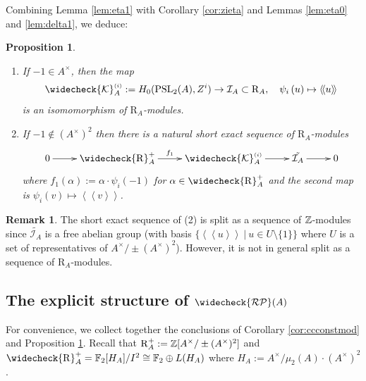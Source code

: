 \documentclass[12pt]{amsart}
\newtheorem{prop}[lem]{Proposition}
\theoremstyle{definition}
\newtheorem{rem}[lem]{Remark}
\newcommand{\F}[1]{\Bbb{F}_{#1}}
\newcommand{\Z}{\Bbb{Z}}
\newcommand{\K}{\mathcal{K}}
\newcommand{\pspl}[2]{\mathrm{PSL}_{#1}(#2)}
\newcommand{\crpb}[1]{\widecheck{\mathcal{RP}}(#1)}
\newcommand{\suss}[2]{\psi_{#1}\left( #2\right)}
\newcommand{\cks}[2]{\widecheck{{\K}}^{\mbox{\tiny $(#1)$}}_{#2}}
\newcommand{\ccconstmod}[1]{\widecheck{\mathcal{D}}_{#1}}
\newcommand{\<}{\langle}
\renewcommand{\>}{\rangle}
\newcommand{\sgr}[1]{\mathrm{R}_{#1}}%
\newcommand{\qsgr}[1]{\mathrm{R}^{+}_{#1}} %
\newcommand{\tsgr}[1]{\widecheck{\mathrm{R}}^{+}_{#1}} %
\newcommand{\pf}[1]{\left\langle\!\left\langle{#1}\right\rangle\!\right\rangle}
\newcommand{\aug}[1]{\mathcal{I}_{#1}}
\begin{document}
Combining Lemma \ref{lem:eta1} with  Corollary \ref{cor:zieta} and Lemmas \ref{lem:eta0} and \ref{lem:delta1}, we  deduce:
\begin{prop}\label{prop:cksia}
\begin{enumerate}
\item  If $-1\in A^\times$,  then the map
\[
\cks{i}{A}:=H_0(\pspl{2}{A},Z^i)\to \aug{A}\subset\sgr{A},\quad \suss{i}{u}\mapsto \pf{u}
\]
is an isomomorphism of $\sgr{A}$-modules.
\item If $-1\not\in (A^\times)^2$ then  there is a natural short exact sequence of $\sgr{A}$-modules 
\[
\xymatrix{
0\ar[r]& \tsgr{A}\ar^-{f_1}[r]&\cks{i}{A}\ar[r]&\tilde{\aug{A}}\ar[r]& 0\\
}
\]
where $f_1(\alpha):=\alpha\cdot\suss{i}{-1}$ for $\alpha\in \tsgr{A}$ and the second map is $\suss{i}{v}\mapsto \pf{v}$.
\end{enumerate}
\end{prop}



\begin{rem} The short exact sequence of (2) is split as a sequence of $\Z$-modules since $\tilde{\aug{A}}$ is a free abelian group (with basis $\{ \pf{u}\ |\ u\in U\setminus\{ 1\} \}$ where 
$U$ is a set of representatives of $A^\times/\pm(A^\times)^2$).  However, it is not in general split as a sequence of $\sgr{A}$-modules.
\end{rem}


\subsection{The explicit structure of $\crpb{A}$}



For convenience, we collect together the conclusions of Corollary \ref{cor:ccconstmod}  and Proposition \ref{prop:cksia}. Recall that $\qsgr{A}:=\Z[A^\times/\pm(A^\times)^2]$ and $\tsgr{A}=\F{2}[H_A]/I^2\cong \F{2}\oplus L(H_A)$ where $H_A:=A^\times/\mu_2(A)\cdot (A^\times)^2$.
\end{document}
